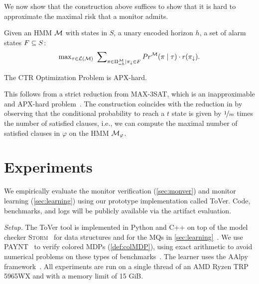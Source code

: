 \documentclass[runningheads]{llncs}
\newcommand{\sj}[2][]{\todo[color=red!50!white,#1]{\footnotesize{SJ: #2}}}
\renewcommand{\paragraph}[1]{\smallskip\noindent\emph{#1}}
\newcommand{\alg}{ToVer\xspace}
\begin{document}
We now show that the construction above suffices to show that it is hard to approximate the maximal risk that a monitor admits.
\begin{definition}
    Given an HMM $\mathcal{M}$ with states in $S$, a unary encoded horizon $h$, a set of alarm states $F\subseteq S$: \[\max\nolimits_{\tau \in \mathcal{L}(\mathcal{M})}~ \sum\nolimits_{\pi\in\Pi^{\mathcal{M}}_{=h}\mid\pi_\downarrow \in F}{Pr}^{\mathcal{M}}(\pi \mid \tau) \cdot r(\pi_\downarrow).\]\end{definition}
\begin{lemma}
    \label{lem:ctpapxhard}
    The CTR Optimization Problem is APX-hard.
\end{lemma}
This follows from a strict reduction from MAX-3SAT, which is an inapproximable and APX-hard problem~\cite{DBLP:journals/jacm/Hastad01}. The construction coincides with the reduction in  by observing that the conditional probability to reach a $t$ state is given by $\nicefrac{1}{m}$ times the number of satisfied clauses, i.e., we can compute the maximal number of satisfied clauses in $\varphi$ on the HMM $\mathcal{M}_\varphi$.



\section{Experiments}\label{sec:experiments}
\noindent We empirically evaluate the monitor verification (\cref{sec:monver}) and monitor learning (\cref{sec:learning}) using our  prototype implementation called \alg.
Code, benchmarks, and logs will be publicly available via the artifact evaluation.


\paragraph{Setup.}
The \alg tool is implemented in Python and C++ on top of the model checker \textsc{Storm}~\cite{henselProbabilisticModelChecker2022} for data structures and for the MQs in \cref{sec:learning}~\cite{jungesRuntimeMonitorsMarkov2021}.
We use PAYNT~\cite{andriushchenkoPAYNTToolInductive2021} to verify colored MDPs (\cref{def:colMDP}), using exact arithmetic to avoid numerical problems on these types of benchmarks~\cite{DBLP:conf/tacas/HartmannsJQW23}.
The learner uses the AAlpy framework~\cite{muskardinAALpyActiveAutomata2022}.
All experiments are run  on a single thread of an AMD Ryzen TRP 5965WX and with a memory limit of 15 GiB.
\end{document}
